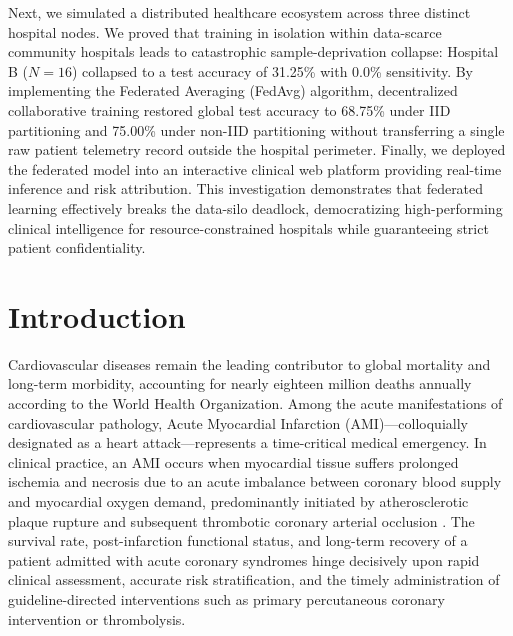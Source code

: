 \documentclass[12pt,a4paper,oneside]{report}
\begin{document}
Next, we simulated a distributed healthcare ecosystem across three distinct hospital nodes. We proved that training in isolation within data-scarce community hospitals leads to catastrophic sample-deprivation collapse: Hospital B ($N=16$) collapsed to a test accuracy of 31.25\% with 0.0\% sensitivity. By implementing the Federated Averaging (FedAvg) algorithm, decentralized collaborative training restored global test accuracy to 68.75\% under IID partitioning and 75.00\% under non-IID partitioning without transferring a single raw patient telemetry record outside the hospital perimeter. Finally, we deployed the federated model into an interactive clinical web platform providing real-time inference and risk attribution. This investigation demonstrates that federated learning effectively breaks the data-silo deadlock, democratizing high-performing clinical intelligence for resource-constrained hospitals while guaranteeing strict patient confidentiality.

\cleardoublepage
{}
{}
\tableofcontents

\cleardoublepage
{}
\setcounter{page}{1}
\chapter{Introduction}
\label{ch:introduction}

Cardiovascular diseases remain the leading contributor to global mortality and long-term morbidity, accounting for nearly eighteen million deaths annually according to the World Health Organization. Among the acute manifestations of cardiovascular pathology, Acute Myocardial Infarction (AMI)—colloquially designated as a heart attack—represents a time-critical medical emergency. In clinical practice, an AMI occurs when myocardial tissue suffers prolonged ischemia and necrosis due to an acute imbalance between coronary blood supply and myocardial oxygen demand, predominantly initiated by atherosclerotic plaque rupture and subsequent thrombotic coronary arterial occlusion \citep{thygesen2018fourth}. The survival rate, post-infarction functional status, and long-term recovery of a patient admitted with acute coronary syndromes hinge decisively upon rapid clinical assessment, accurate risk stratification, and the timely administration of guideline-directed interventions such as primary percutaneous coronary intervention or thrombolysis.
\end{document}

